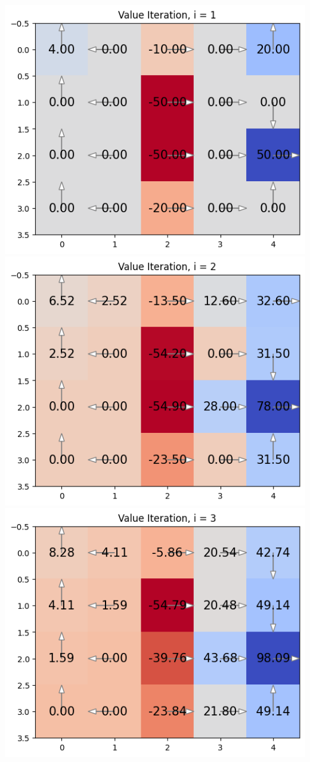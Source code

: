 \documentclass[expanded]{lkx_pset}
\begin{document}
\begin{solution}
	\begin{center}
		\includegraphics[scale=0.5]{figures/2b-1.png}
		\includegraphics[scale=0.5]{figures/2b-2.png}
		\includegraphics[scale=0.5]{figures/2b-3.png}

\end{center}
\end{solution}
\end{document}
